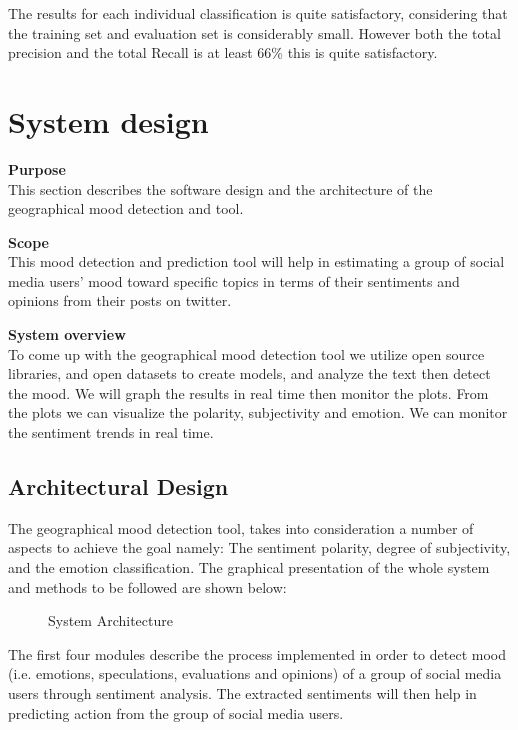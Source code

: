 The results for each individual classification is quite satisfactory, considering that the training set and evaluation set is considerably small. However both the total precision and the total Recall is at least 66\% this is quite satisfactory.


\section{System design}

\textbf{Purpose}\\
This section describes the software design and the architecture of the geographical mood detection and tool.

\textbf{Scope}\\
This mood detection and prediction tool will help in estimating a group of social media users'
mood toward specific topics in terms of their sentiments and opinions from their posts on twitter.

\textbf{System overview}\\

To come up with the geographical mood detection tool we utilize open source libraries, and open datasets to create models, and analyze the text then detect the mood. We will graph the results in real time then monitor the plots. From the plots we can visualize the polarity, subjectivity and emotion. We can monitor the sentiment trends in real time.

\subsection{Architectural Design}
The geographical mood detection tool, takes into consideration a number of aspects to achieve the goal namely: The sentiment polarity, degree of subjectivity, and the emotion classification. The graphical presentation of the whole system and methods to be followed are shown below:

\begin{figure}[h]
  \centering
  \caption[System Architecture]%
  {System Architecture}
  \label{fig:ALAP:sm1}
\end{figure}


The first four modules describe the process implemented in order to detect mood (i.e. emotions,
speculations, evaluations and opinions) of a group of social media users through sentiment
analysis. The extracted sentiments will then help in predicting action from the group of social
media users.

